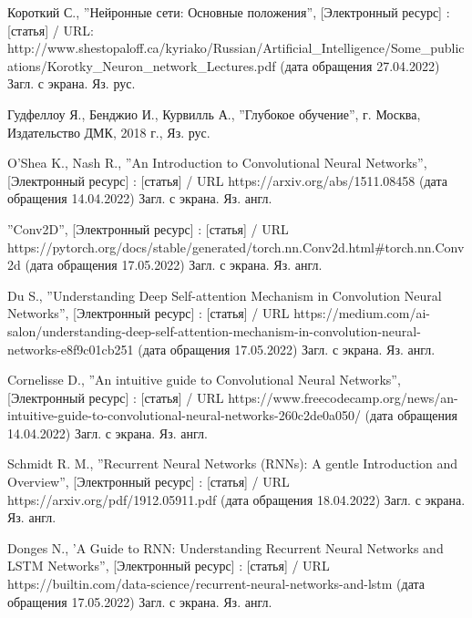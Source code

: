 \documentclass[bachelor, och, coursework]{SCWorks}
\begin{document}
\begin{thebibliography}{99}
     Короткий С., ''Нейронные сети: Основные положения'',
    [Электронный ресурс] : [статья] / URL:
    http://www.shestopaloff.ca/kyriako/Russian/Artificial_Intelligence/Some_publications/Korotky_Neuron_network_Lectures.pdf
    (дата обращения 27.04.2022) Загл. с экрана. Яз. рус.
    
     Гудфеллоу Я., Бенджио И., Курвилль А., ''Глубокое обучение'',
    г. Москва, Издательство ДМК, 2018 г., Яз. рус.
    

     O'Shea K., Nash R., ''An Introduction to Convolutional Neural
    Networks'', [Электронный ресурс] : [статья] / URL
    https://arxiv.org/abs/1511.08458 (дата обращения 14.04.2022) Загл. с экрана.
    Яз. англ.
    
     ''Conv2D'', [Электронный ресурс] : [статья] / URL
    https://pytorch.org/docs/stable/generated/torch.nn.Conv2d.html\#torch.nn.Conv2d
    (дата обращения 17.05.2022) Загл. с экрана. Яз. англ.

     Du S., ''Understanding Deep Self-attention Mechanism in
    Convolution Neural Networks'', [Электронный ресурс] : [статья] / URL
    https://medium.com/ai-salon/understanding-deep-self-attention-mechanism-in-convolution-neural-networks-e8f9c01cb251
    (дата обращения 17.05.2022) Загл. с экрана. Яз. англ.

     Cornelisse D., ''An intuitive guide to Convolutional Neural
    Networks'', [Электронный ресурс] : [статья] / URL
    https://www.freecodecamp.org/news/an-intuitive-guide-to-convolutional-neural-networks-260c2de0a050/
    (дата обращения 14.04.2022) Загл. с экрана. Яз. англ.

    
     Schmidt R. M., ''Recurrent Neural Networks (RNNs): A gentle
    Introduction and Overview'', [Электронный ресурс] : [статья] / URL
    https://arxiv.org/pdf/1912.05911.pdf (дата обращения 18.04.2022) Загл. с
    экрана. Яз. англ.

     Donges N., 'A Guide to RNN: Understanding Recurrent Neural
    Networks and LSTM Networks'', [Электронный ресурс] : [статья] / URL
    https://builtin.com/data-science/recurrent-neural-networks-and-lstm (дата
    обращения 17.05.2022) Загл. с экрана. Яз. англ.


\end{thebibliography}
\end{document}
